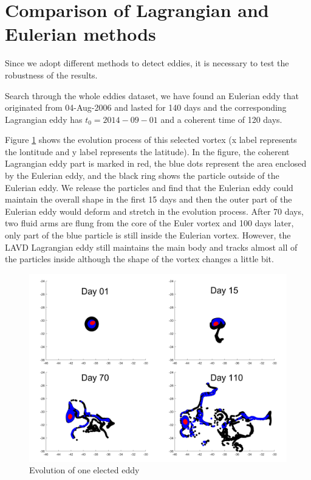\section{Comparison of Lagrangian and Eulerian methods}

Since we adopt different methods to detect eddies, it is necessary to test the robustness of the results.


Search through the whole eddies dataset, we have found an Eulerian eddy that originated from 04-Aug-2006 and lasted for 140 days and the corresponding Lagrangian eddy has $t_0 = 2014-09-01$ and a coherent time of 120 days.

Figure \ref{coherence of eddy} shows the evolution process of this selected vortex (x label represents the lontitude and y label represents the latitude). In the figure, the coherent Lagrangian eddy part is marked in red, the blue dots represent the area enclosed by the Eulerian eddy, and the black ring shows the particle outside of the Eulerian eddy. We release the particles and find that the Eulerian eddy could maintain the overall shape in the first 15 days and then the outer part of the Eulerian eddy would deform and stretch in the evolution process. After 70 days, two fluid arms are flung from the core of the Euler vortex and 100 days later, only part of the blue particle is still inside the Eulerian vortex. However, the LAVD Lagrangian eddy still maintains the main body and tracks almost all of the particles inside although the shape of the vortex changes a little bit.

\begin{figure}[ht]
  \centering
  \setlength{\abovecaptionskip}{0.cm}
  \includegraphics[width=1.0\textwidth]{chapter/figure/coherence of eddy.png}
  \caption
  {Evolution of one elected eddy}
  \label{coherence of eddy}
\end{figure}

